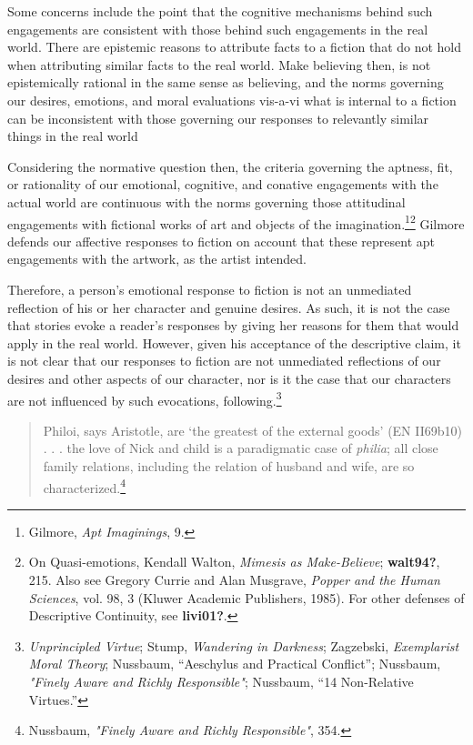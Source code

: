 \documentclass[phdthesis,12pt,final]{wuthesis}
\theoremstyle{definition}
\theoremstyle{definition}
\theoremstyle{definition}
\theoremstyle{definition}
\theoremstyle{remark}
\begin{document}
Some concerns include the point that the cognitive mechanisms behind such engagements are consistent with those behind such engagements in the real world. There are epistemic reasons to attribute facts to a fiction that do not hold when attributing similar facts to the real world. Make believing then, is not epistemically rational in the same sense as believing, and the norms governing our desires, emotions, and moral evaluations vis-a-vi what is internal to a fiction can be inconsistent with those governing our responses to relevantly similar things in the real world

Considering the normative question then, the criteria governing the aptness, fit, or rationality of our emotional, cognitive, and conative engagements with the actual world are continuous with the norms governing those attitudinal engagements with fictional works of art and objects of the imagination.\footnote{Gilmore, \emph{Apt {Imaginings}}, 9.}\footnote{On Quasi-emotions, Kendall Walton, \emph{Mimesis as {Make-Believe}}; \textbf{walt94?}, 215. Also see Gregory Currie and Alan Musgrave, \emph{Popper and the Human Sciences}, vol. 98, 3 (Kluwer Academic Publishers, 1985). For other defenses of Descriptive Continuity, see \textbf{livi01?}.} Gilmore defends our affective responses to fiction on account that these represent apt engagements with the artwork, as the artist intended.

Therefore, a person's emotional response to fiction is not an unmediated reflection of his or her character and genuine desires. As such, it is not the case that stories evoke a reader's responses by giving her reasons for them that would apply in the real world. However, given his acceptance of the descriptive claim, it is not clear that our responses to fiction are not unmediated reflections of our desires and other aspects of our character, nor is it the case that our characters are not influenced by such evocations, following.\footnote{\emph{Unprincipled {Virtue}}; Stump, \emph{Wandering in {Darkness}}; Zagzebski, \emph{Exemplarist {Moral Theory}}; Nussbaum, {``Aeschylus and Practical Conflict''}; Nussbaum, \emph{"{Finely Aware} and {Richly Responsible}"}; Nussbaum, {``14 {Non-Relative Virtues}.''}}

\begin{quote}
Philoi, says Aristotle, are `the greatest of the external goods' (EN II69b10) . . . the love of Nick and child is a paradigmatic case of \emph{philia}; all close family relations, including the relation of husband and wife, are so characterized.\footnote{Nussbaum, \emph{"{Finely Aware} and {Richly Responsible}"}, 354.}
\end{quote}
\end{document}
